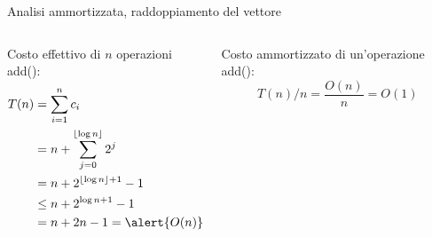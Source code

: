 \begin{frame}{Analisi ammortizzata, raddoppiamento del vettore}
	
\begin{columns}[T]
\begin{column}{0.57\textwidth}
\alert{Costo effettivo di $n$ operazioni \textsf{add}()}:
\begin{align*}
  T(n) &= \sum_{i=1}^n c_i \\
       &= n + \sum_{j=0}^{\lfloor \log n \rfloor} 2^j \\
	   &=  n + 2^{\lfloor \log n \rfloor + 1} - 1 \\
	   &\leq  n + 2^{\log n + 1} - 1 \\
	   &=  n + 2n - 1 = \alert{O(n)}
\end{align*}
\end{column}
\begin{column}{0.43\textwidth}
\alert{Costo ammortizzato di un'operazione \textsf{add}()}: \[ T(n)/n = \frac{O(n)}{n} = O(1)\]
\end{column}
\end{columns}

\end{frame}

